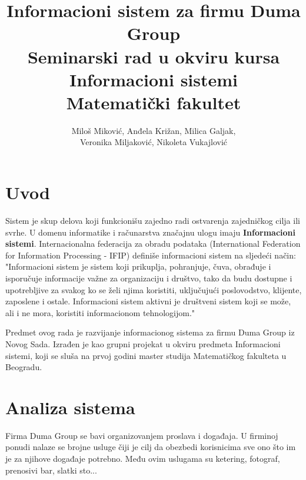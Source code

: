 \documentclass[a4paper]{article}
\begin{document}
\title{Informacioni sistem za firmu Duma Group\\ \small{Seminarski rad u okviru kursa\\Informacioni sistemi\\ Matematički fakultet}}

\author{Miloš Miković, Anđela Križan, Milica Galjak, \\ Veronika Miljaković, Nikoleta Vukajlović}


\maketitle

\abstract{
}

\tableofcontents

\newpage

\section{Uvod}

 Sistem je skup delova koji funkcionišu zajedno radi ostvarenja zajedničkog cilja ili svrhe. U domenu informatike i računarstva značajnu ulogu imaju \textbf{Informacioni sistemi}. Internacionalna federacija za obradu podataka (International Federation for Information Processing - IFIP) definiše informacioni sistem na sljedeći način: "Informacioni sistem je sistem koji prikuplja, pohranjuje, čuva, obrađuje i isporučuje informacije važne za organizaciju i društvo, tako da budu dostupne i upotrebljive za svakog ko se želi njima koristiti, uključujući poslovodstvo, klijente, zaposlene i ostale. Informacioni sistem aktivni je društveni sistem koji se može, ali i ne mora, koristiti      informacionom tehnologijom." 
    
 Predmet ovog rada je razvijanje informacionog sistema za firmu Duma Group iz Novog Sada. Izrađen je kao grupni projekat u okviru predmeta Informacioni sistemi, koji se sluša na prvoj godini master studija Matematičkog fakulteta u Beogradu.

\section{Analiza sistema}

Firma Duma Group se bavi organizovanjem proslava i događaja. U firminoj ponudi nalaze se brojne usluge čiji je cilj da obezbedi korisnicima sve ono što im je za njihove događaje potrebno. Među ovim uslugama su ketering, fotograf, prenosivi bar, slatki sto...
\end{document}
